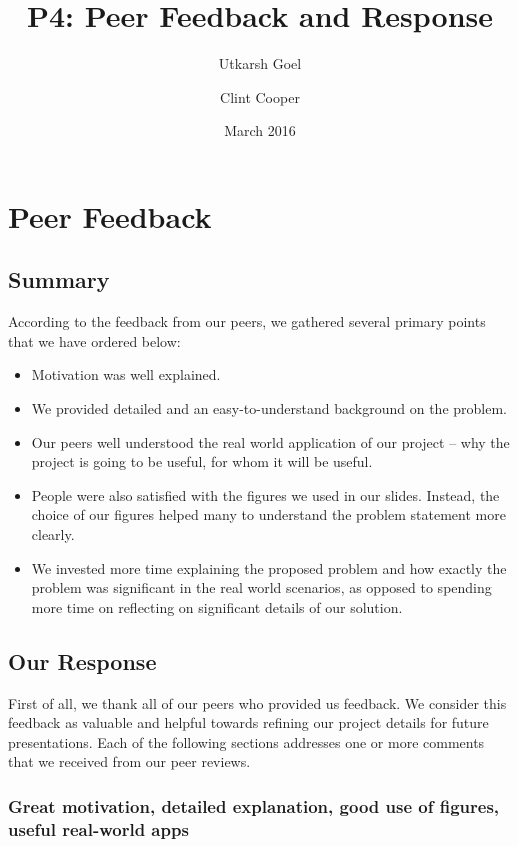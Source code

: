 \documentclass{llcns}
\title{P4: Peer Feedback and Response}
\author{Utkarsh Goel \and Clint Cooper}
\institute{Department of Computer Science\\Montana State University, Bozeman MT 59717\\
\email{\{utkarsh.goel, clint.cooper\}@montana.edu}
}
\date{March 2016}
\begin{document}
\maketitle

\section{Peer Feedback}

\subsection{Summary}
According to the feedback from our peers, we gathered several primary points that we have ordered below: 
\begin{itemize}
    \item Motivation was well explained.
    \item We provided detailed and an easy-to-understand background on the problem.
    \item Our peers well understood the real world application of our project -- why the project is going to be useful, for whom it will be useful.
    \item People were also satisfied with the figures we used in our slides. Instead, the choice of our figures helped many to understand the problem statement more clearly.
    \item We invested more time explaining the proposed problem and how exactly the problem was significant in the real world scenarios, as opposed to spending more time on reflecting on significant details of our solution.
\end{itemize}

\subsection{Our Response}

First of all, we thank all of our peers who provided us feedback.
We consider this feedback as valuable and helpful towards refining our project details for future presentations.
Each of the following sections addresses one or more comments that we received from our peer reviews.

\subsubsection*{Great motivation, detailed explanation, good use of figures, useful real-world apps\\}
\end{document}
